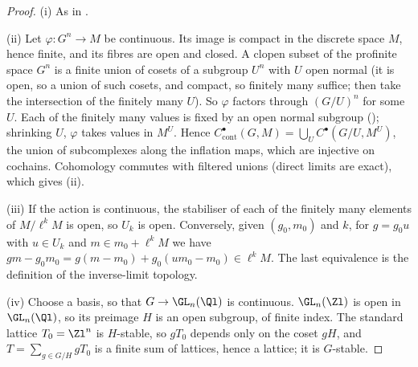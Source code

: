 \begin{proof}
(i) As in .

(ii) Let $\varphi\colon G^n\to M$ be continuous. Its image is compact in the discrete space $M$, hence finite, and its fibres are open and closed. A clopen subset
of the profinite space $G^n$ is a finite union of cosets of a subgroup $U^n$ with $U$ open normal (it is open, so a union of such cosets, and compact, so
finitely many suffice; then take the intersection of the finitely many $U$). So $\varphi$ factors through $(G/U)^n$ for some $U$. Each of the finitely many values
is fixed by an open normal subgroup (); shrinking $U$, $\varphi$ takes values in $M^U$. Hence
$C^\bullet_{\mathrm{cont}}(G,M)=\bigcup_UC^\bullet(G/U,M^U)$, the union of subcomplexes along the inflation maps, which are injective on cochains. Cohomology
commutes with filtered unions (direct limits are exact), which gives (ii).

(iii) If the action is continuous, the stabiliser of each of the finitely many elements of $M/\ell^kM$ is open, so $U_k$ is open. Conversely, given $(g_0,m_0)$
and $k$, for $g=g_0u$ with $u\in U_k$ and $m\in m_0+\ell^kM$ we have $gm-g_0m_0=g(m-m_0)+g_0(um_0-m_0)\in\ell^kM$. The last equivalence is the definition of the
inverse-limit topology.

(iv) Choose a basis, so that $G\to\GL_n(\Ql)$ is continuous. $\GL_n(\Zl)$ is open in $\GL_n(\Ql)$, so its preimage $H$ is an open subgroup, of finite index.
The standard lattice $T_0=\Zl^n$ is $H$-stable, so $gT_0$ depends only on the coset $gH$, and $T=\sum_{g\in G/H}gT_0$ is a finite sum of lattices, hence a
lattice; it is $G$-stable.
\end{proof}

